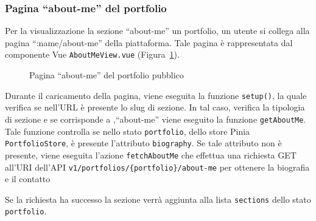 \subsubsection{Pagina ``about-me'' del portfolio}
Per la visualizzazione la sezione ``about-me'' un portfolio, un utente si collega alla pagina ``:name/about-me'' della piattaforma. Tale pagina \`e rappresentata dal componente Vue \verb|AboutMeView.vue| (Figura~\ref{fig:p-am-view}).
\begin{figure}[htbp]
	\centering
	\fboxsep=0.5pt
	\fboxrule=0.5pt
	\caption{Pagina ``about-me'' del portfolio pubblico}
	\label{fig:p-am-view}
\end{figure}

Durante il caricamento della pagina, viene eseguita la funzione \verb|setup()|, la quale verifica se nell'URL \`e presente lo slug di sezione. In tal caso, verifica la tipologia di sezione e se corrisponde a ,``about-me'' viene eseguito la funzione \verb|getAboutMe|. Tale funzione controlla se nello stato \verb|portfolio|, dello store Pinia \verb|PortfolioStore|, \`e presente l'attributo \verb|biography|. Se tale attributo non \`e presente, viene eseguita l'azione \verb|fetchAboutMe| che effettua una richiesta GET all'URI dell'API \verb|v1/portfolios/{portfolio}/about-me| per ottenere la biografia e il contatto

Se la richiesta ha successo la sezione verr\`a aggiunta alla lista \verb|sections| dello stato \verb|portfolio|.














